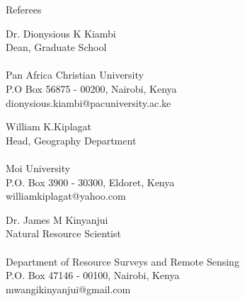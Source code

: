 \documentclass{resume} %
\begin{document}


\begin{rSection}{Referees}
\begin{esSubsection}
{Dr. Dionysious K Kiambi}\\
{Dean, Graduate School}\\
{}\\
{Pan Africa Christian University}\\
{P.O Box 56875 - 00200, Nairobi, Kenya}\\
{dionysious.kiambi@pacuniversity.ac.ke}
\end{esSubsection}

\begin{esSubsection}
{William  K.Kiplagat}\\
{Head, Geography Department}\\
{}\\
{Moi University}\\
{P.O. Box 3900 - 30300, Eldoret, Kenya}\\
{williamkiplagat@yahoo.com}
\end{esSubsection}

\begin{esSubsection}
{Dr. James M Kinyanjui}\\
{Natural Resource Scientist}\\
{}\\
{Department of Resource Surveys and Remote Sensing}\\
{P.O. Box 47146 - 00100, Nairobi, Kenya}\\
{mwangikinyanjui@gmail.com}
\end{esSubsection}

\end{rSection}
\end{document}
